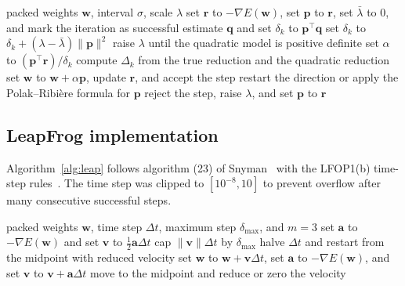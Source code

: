 \documentclass[conference,10pt]{IEEEtran}
\begin{document}
\begin{algorithm}[t]
\caption{Scaled conjugate gradient}
\label{alg:scg}
\begin{algorithmic}[1]
\Require packed weights $\mathbf{w}$, interval $\sigma$, scale $\lambda$
\State set $\mathbf{r}$ to $-\nabla E(\mathbf{w})$, set $\mathbf{p}$ to $\mathbf{r}$, set $\bar{\lambda}$ to $0$, and mark the iteration as successful
    \State estimate $\mathbf{q}$ and set $\delta_{k}$ to $\mathbf{p}^{\top}\mathbf{q}$
  \EndIf
  \State set $\delta_{k}$ to $\delta_{k}+(\lambda-\bar{\lambda})\lVert\mathbf{p}\rVert^{2}$
    \State raise $\lambda$ until the quadratic model is positive definite
  \EndIf
  \State set $\alpha$ to $(\mathbf{p}^{\top}\mathbf{r})/\delta_{k}$
  \State compute $\Delta_{k}$ from the true reduction and the quadratic reduction
    \State set $\mathbf{w}$ to $\mathbf{w}+\alpha\mathbf{p}$, update $\mathbf{r}$, and accept the step
    \State restart the direction or apply the Polak--Ribi\`ere formula for $\mathbf{p}$
  \Else
    \State reject the step, raise $\lambda$, and set $\mathbf{p}$ to $\mathbf{r}$
  \EndIf
\EndWhile
\end{algorithmic}
\end{algorithm}

\subsection{LeapFrog implementation}
Algorithm~\ref{alg:leap} follows algorithm (23) of Snyman~\cite{snyman1982} with the LFOP1(b) time-step rules~\cite{snyman1983}.
The time step was clipped to $[10^{-8},10]$ to prevent overflow after many consecutive successful steps.

\begin{algorithm}[t]
\caption{LeapFrog LFOP1(b)}
\label{alg:leap}
\begin{algorithmic}[1]
\Require packed weights $\mathbf{w}$, time step $\Delta t$, maximum step $\delta_{\max}$, and $m=3$
\State set $\mathbf{a}$ to $-\nabla E(\mathbf{w})$ and set $\mathbf{v}$ to $\tfrac{1}{2}\mathbf{a}\Delta t$
  \State cap $\lVert\mathbf{v}\rVert\Delta t$ by $\delta_{\max}$
    \State halve $\Delta t$ and restart from the midpoint with reduced velocity
  \EndIf
  \State set $\mathbf{w}$ to $\mathbf{w}+\mathbf{v}\Delta t$, set $\mathbf{a}$ to $-\nabla E(\mathbf{w})$, and set $\mathbf{v}$ to $\mathbf{v}+\mathbf{a}\Delta t$
    \State move to the midpoint and reduce or zero the velocity
  \EndIf
\EndWhile
\end{algorithmic}
\end{algorithm}
\end{document}
